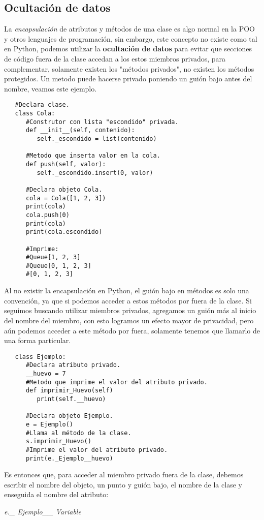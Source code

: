 \subsection{Ocultación de datos}
\hspace{0.55cm}La \textit{encapsulación} de atributos y métodos de una clase es algo normal en la POO y otros lenguajes de programación, sin embargo, este concepto no existe como tal en Python, podemos utilizar la \textbf{ocultación de datos} para evitar que secciones de código fuera de la clase accedan a los estos miembros privados, para complementar, solamente existen los "métodos  privados", no existen los métodos protegidos. Un metodo puede hacerse privado poniendo un guión bajo antes del nombre, veamos este ejemplo.
\begin{lstlisting}
   #Declara clase.
   class Cola:
      #Construtor con lista "escondido" privada.
      def __init__(self, contenido):
         self._escondido = list(contenido)
      
      #Metodo que inserta valor en la cola.
      def push(self, valor):
         self._escondido.insert(0, valor)
         
      #Declara objeto Cola.
      cola = Cola([1, 2, 3])
      print(cola)
      cola.push(0)
      print(cola)
      print(cola.escondido)
      
      #Imprime:
      #Queue[1, 2, 3]
      #Queue[0, 1, 2, 3]
      #[0, 1, 2, 3]
\end{lstlisting}

Al no existir la encapsulación en Python, el guión bajo en métodos es solo una convención, ya que si podemos acceder a estos métodos por fuera de la clase. Si seguimos buscando utilizar miembros privados, agregamos un guión más al inicio del nombre del miembro, con esto logramos un efecto mayor de privacidad, pero aún podemos acceder a este método por fuera, solamente tenemos que llamarlo de una forma particular.
\begin{lstlisting}
   class Ejemplo:
      #Declara atributo privado.
      __huevo = 7
      #Metodo que imprime el valor del atributo privado.
      def imprimir_Huevo(self)
         print(self.__huevo)
         
      #Declara objeto Ejemplo.
      e = Ejemplo()
      #Llama al método de la clase.
      s.imprimir_Huevo()
      #Imprime el valor del atributo privado.
      print(e._Ejemplo__huevo)
\end{lstlisting}

Es entonces que, para acceder al miembro privado fuera de la clase, debemos escribir el nombre del objeto, un punto y guión bajo, el nombre de la clase y enseguida el nombre del atributo:
\begin{center}
	\textit{e.\_ Ejemplo\_\_ Variable}
\end{center}


